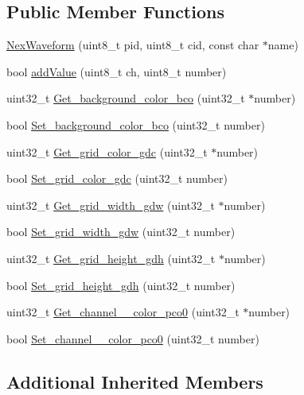 \subsection*{Public Member Functions}
\begin{DoxyCompactItemize}
\item 
\hyperlink{class_nex_waveform_a4f18ca5050823e874d526141c8595514}{Nex\+Waveform} (uint8\+\_\+t pid, uint8\+\_\+t cid, const char $\ast$name)
\item 
bool \hyperlink{class_nex_waveform_a5b04ea7397b784947b845e2a03fc77e4}{add\+Value} (uint8\+\_\+t ch, uint8\+\_\+t number)
\item 
uint32\+\_\+t \hyperlink{class_nex_waveform_a66cec3c4d0d1a769dbf50c8092cc01d1}{Get\+\_\+background\+\_\+color\+\_\+bco} (uint32\+\_\+t $\ast$number)
\item 
bool \hyperlink{class_nex_waveform_aefec5eb25ee698c8c940c9190d60b696}{Set\+\_\+background\+\_\+color\+\_\+bco} (uint32\+\_\+t number)
\item 
uint32\+\_\+t \hyperlink{class_nex_waveform_ac5a6622e9004600f24b12e60ebb6b984}{Get\+\_\+grid\+\_\+color\+\_\+gdc} (uint32\+\_\+t $\ast$number)
\item 
bool \hyperlink{class_nex_waveform_ab396211f736824a0210446e68dc3edf4}{Set\+\_\+grid\+\_\+color\+\_\+gdc} (uint32\+\_\+t number)
\item 
uint32\+\_\+t \hyperlink{class_nex_waveform_ad5c4968c81d4941a08841cbaf217c631}{Get\+\_\+grid\+\_\+width\+\_\+gdw} (uint32\+\_\+t $\ast$number)
\item 
bool \hyperlink{class_nex_waveform_a41cb6d8b1ff6c309d1c4e8a1f73304fe}{Set\+\_\+grid\+\_\+width\+\_\+gdw} (uint32\+\_\+t number)
\item 
uint32\+\_\+t \hyperlink{class_nex_waveform_a87f6baf5a7a9c52f54281865e757d9a3}{Get\+\_\+grid\+\_\+height\+\_\+gdh} (uint32\+\_\+t $\ast$number)
\item 
bool \hyperlink{class_nex_waveform_a85e776a5347c22efd9abe9bb8cfdbddb}{Set\+\_\+grid\+\_\+height\+\_\+gdh} (uint32\+\_\+t number)
\item 
uint32\+\_\+t \hyperlink{class_nex_waveform_a09e36144f65c73b21edcfd5caff8a914}{Get\+\_\+channel\+\_\+\_\+color\+\_\+pco0} (uint32\+\_\+t $\ast$number)
\item 
bool \hyperlink{class_nex_waveform_ade323e0eae3b5058a76245e5ac97b037}{Set\+\_\+channel\+\_\+\_\+color\+\_\+pco0} (uint32\+\_\+t number)
\end{DoxyCompactItemize}
\subsection*{Additional Inherited Members}


